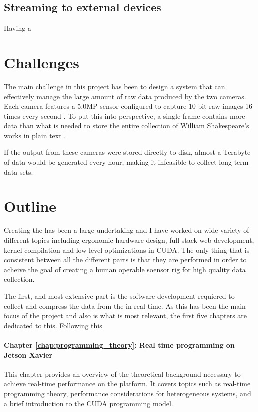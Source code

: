 \subsection{Streaming to external devices}
Having a


\section{Challenges}
The main challenge in this project has been to design a system that can effectively manage the large amount of raw data produced by the two cameras.
Each camera features a 5.0MP sensor configured to capture 10-bit raw images 16 times every second \cite{lucidvisionlabsTriton0MPPolarization}.
To put this into perspective, a single frame contains more data than what is needed to store the entire collection of William Shakespeare's works in plain text \cite{projectgutenbergCompleteWorksWilliam1994}.

If the output from these cameras were stored directly to disk, almost a Terabyte of data would be generated every hour, making it infeasible to collect long term data sets.


\section{Outline}
Creating the \sr has been a large undertaking and I have worked on wide variety of different topics including ergonomic hardware design, full stack web development, kernel compilation and low level optimizations in CUDA.
The only thing that is consistent between all the different parts is that they are performed in order to acheive the goal of creating a human operable soensor rig for high quality data collection.










The first, and most extensive part is the software development requiered to collect and compress the data from the \sr in real time.
As this has been the main focus of the project and also is what is most relevant, the first five chapters are dedicated to this.
Following this

\paragraph{Chapter \ref{chap:programming_theory}: Real time programming on Jetson Xavier}
This chapter provides an overview of the theoretical background necessary to achieve real-time performance on the \jx platform.
It covers topics such as real-time programming theory, performance considerations for heterogeneous systems, and a brief introduction to the CUDA programming model.

